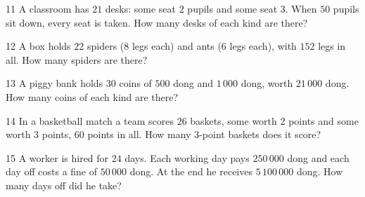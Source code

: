\gap
\begin{probbox}{11}{\relax}
A classroom has $21$ desks: some seat $2$ pupils and some seat $3$. When $50$ pupils sit down, every seat is taken. How many desks of each kind are there?
\end{probbox}
\gap
\begin{probbox}{12}{\relax}
A box holds $22$ spiders ($8$ legs each) and ants ($6$ legs each), with $152$ legs in all. How many spiders are there?
\end{probbox}
\gap
\begin{probbox}{13}{\relax}
A piggy bank holds $30$ coins of $500$ dong and $1\,000$ dong, worth $21\,000$ dong. How many coins of each kind are there?
\end{probbox}
\gap
\begin{probbox}{14}{\relax}
In a basketball match a team scores $26$ baskets, some worth $2$ points and some worth $3$ points, $60$ points in all. How many $3$-point baskets does it score?
\end{probbox}
\gap
\begin{probbox}{15}{\relax}
A worker is hired for $24$ days. Each working day pays $250\,000$ dong and each day off costs a fine of $50\,000$ dong. At the end he receives $5\,100\,000$ dong. How many days off did he take?
\end{probbox}
